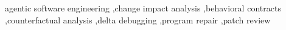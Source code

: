 \documentclass[a4paper,fleqn]{cas-sc}
\newcommand{\tool}{\textsc{Shift}}
\begin{document}
\begin{abstract}
\end{abstract}
\begin{keywords}
agentic software engineering \sep change impact analysis \sep behavioral contracts \sep counterfactual analysis \sep delta debugging \sep program repair \sep patch review
\end{keywords}
\maketitle
\raggedbottom


\end{document}
